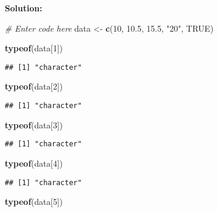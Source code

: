 \documentclass[
]{article}
\newenvironment{Shaded}{\begin{snugshade}}{\end{snugshade}}
\newcommand{\CommentTok}[1]{\textcolor[rgb]{0.56,0.35,0.01}{\textit{#1}}}
\newcommand{\ConstantTok}[1]{\textcolor[rgb]{0.56,0.35,0.01}{#1}}
\newcommand{\DecValTok}[1]{\textcolor[rgb]{0.00,0.00,0.81}{#1}}
\newcommand{\FloatTok}[1]{\textcolor[rgb]{0.00,0.00,0.81}{#1}}
\newcommand{\FunctionTok}[1]{\textcolor[rgb]{0.13,0.29,0.53}{\textbf{#1}}}
\newcommand{\NormalTok}[1]{#1}
\newcommand{\OtherTok}[1]{\textcolor[rgb]{0.56,0.35,0.01}{#1}}
\newcommand{\StringTok}[1]{\textcolor[rgb]{0.31,0.60,0.02}{#1}}
\begin{document}
\textbf{Solution:}

\begin{Shaded}
\begin{Highlighting}[]
\CommentTok{\# Enter code here}
\NormalTok{data }\OtherTok{\textless{}{-}} \FunctionTok{c}\NormalTok{(}\DecValTok{10}\NormalTok{, }\FloatTok{10.5}\NormalTok{, }\FloatTok{15.5}\NormalTok{, }\StringTok{"20"}\NormalTok{, }\ConstantTok{TRUE}\NormalTok{)}

\FunctionTok{typeof}\NormalTok{(data[}\DecValTok{1}\NormalTok{])}
\end{Highlighting}
\end{Shaded}

\begin{verbatim}
## [1] "character"
\end{verbatim}

\begin{Shaded}
\begin{Highlighting}[]
\FunctionTok{typeof}\NormalTok{(data[}\DecValTok{2}\NormalTok{])}
\end{Highlighting}
\end{Shaded}

\begin{verbatim}
## [1] "character"
\end{verbatim}

\begin{Shaded}
\begin{Highlighting}[]
\FunctionTok{typeof}\NormalTok{(data[}\DecValTok{3}\NormalTok{])}
\end{Highlighting}
\end{Shaded}

\begin{verbatim}
## [1] "character"
\end{verbatim}

\begin{Shaded}
\begin{Highlighting}[]
\FunctionTok{typeof}\NormalTok{(data[}\DecValTok{4}\NormalTok{])}
\end{Highlighting}
\end{Shaded}

\begin{verbatim}
## [1] "character"
\end{verbatim}

\begin{Shaded}
\begin{Highlighting}[]
\FunctionTok{typeof}\NormalTok{(data[}\DecValTok{5}\NormalTok{])}
\end{Highlighting}
\end{Shaded}
\end{document}
